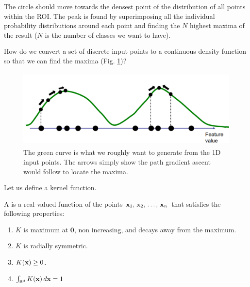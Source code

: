 \documentclass[a4paper]{article}
\begin{document}
\faCheckCircle \; The circle should move towards the densest point of the distribution of all points within the ROI. The peak is found by superimposing all the individual probability distributions around each point and finding the $N$ highest maxima of the result ($N$ is the number of classes we want to have).

\faQuestionCircle \; How do we convert a set of discrete input points to a continuous density function so that we can find the maxima (Fig. \ref{fig:discr_points_to_cont_line})?
\begin{figure}[H]
    \centering
    \includegraphics[height=4cm]{img/mean_shift/points_to_cont_green_line.PNG}
    \caption{The green curve is what we roughly want to generate from the 1D input points. The arrows simply show the path gradient ascent would follow to locate the maxima.}
    \label{fig:discr_points_to_cont_line}
\end{figure}
\faCheckCircle \; Let us define a kernel function.
\begin{definition}
A  is a real-valued function of the points $\textbf{x}_1,\, \textbf{x}_2,\, \ldots, \, \textbf{x}_n$ that satisfies the following properties:
\begin{enumerate}
    \item $K$ is maximum at $\textbf{0}$, non increasing, and decays away from the maximum.
    \item $K$ is radially symmetric.
    \item $K(\textbf{x}) \geq 0$.
    \item $\int_{\mathbb{R}^d} K(\textbf{x})\, d\textbf{x}=1$
\end{enumerate}
\label{def:kernel_func}
\end{definition}
\end{document}
